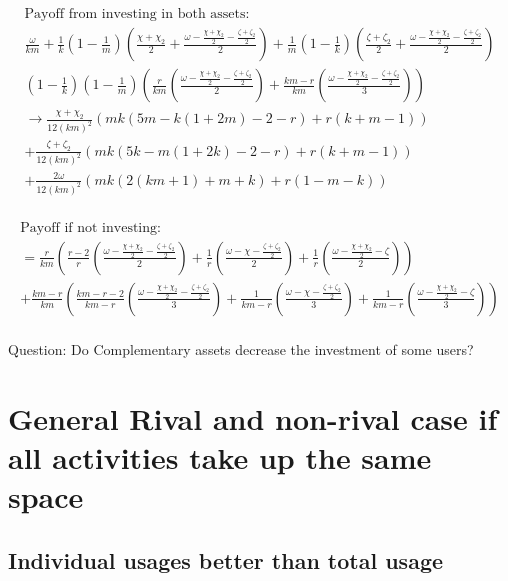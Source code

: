 \documentclass{article}
\begin{document}
\begin{align*}
\text{Payoff from investing in both assets:} \\
\frac{\omega}{km}
+\frac{1}{k}
\left(
1-\frac{1}{m}
\right)
\left( \frac{\chi+\chi_2}{2} +\frac{\omega - \frac{\chi+\chi_2}{2}-\frac{\zeta+\zeta_2}{2}}{2}
\right) 
+\frac{1}{m}
\left(
1-\frac{1}{k}\right)\left( \frac{\zeta+\zeta_2}{2} +\frac{\omega - \frac{\chi+\chi_2}{2}-\frac{\zeta+\zeta_2}{2}}{2}\right) \\
\left(
1-\frac{1}{k}
\right)
\left(
1-\frac{1}{m}
\right)
\left(
\frac{r}{km}
\left(
\frac{\omega - \frac{\chi+\chi_2}{2}-\frac{\zeta+\zeta_2}{2}}{2}
\right)
+
\frac{km-r}{km}
\left(
\frac{\omega - \frac{\chi+\chi_2}{2}-\frac{\zeta+\zeta_2}{2}}{3}
\right)
\right) \\
\rightarrow 
\frac{\chi+\chi_2}{12(km)^{2}}
\left(
mk(5m-k(1+2m)-2-r)+r(k+m-1)
\right) \\
+\frac{\zeta+\zeta_2}{12(km)^{2}}
\left(
mk(5k-m(1+2k)-2-r)+r(k+m-1)
\right) \\
+\frac{2 \omega}{12(km)^{2}}
\left(
mk(2(km+1)+m+k)+r(1-m-k)
\right) \\
\end{align*}

\begin{align*}
\text{Payoff if not investing:} \\
=\frac{r}{km}
\left(
\frac{r-2}{r} 
\left( 
\frac{\omega - \frac{\chi+\chi_2}{2}-\frac{\zeta+\zeta_2}{2}}{2} 
\right)
+\frac{1}{r} 
\left( 
\frac{\omega - \chi-\frac{\zeta+\zeta_2}{2}}{2} 
\right)
+\frac{1}{r} 
\left( \frac{\omega - \frac{\chi+\chi_2}{2}-\zeta}{2} 
\right)
\right) \\
+
\frac{km-r}{km}
\left(
\frac{km-r-2}{km-r}
\left(
\frac{\omega - \frac{\chi+\chi_2}{2}-\frac{\zeta+\zeta_2}{2}}{3}
\right)
+
\frac{1}{km-r}
\left(
\frac{\omega -\chi-\frac{\zeta+\zeta_2}{2}}{3}
\right)
+
\frac{1}{km-r}
\left(
\frac{\omega - \frac{\chi+\chi_2}{2}-\zeta}{3}
\right)
\right) \\
\end{align*}


Question: Do Complementary assets decrease the investment of some users?

\section{General Rival and non-rival case if all activities take up the same space}

\subsection{Individual usages better than total usage}
\end{document}
